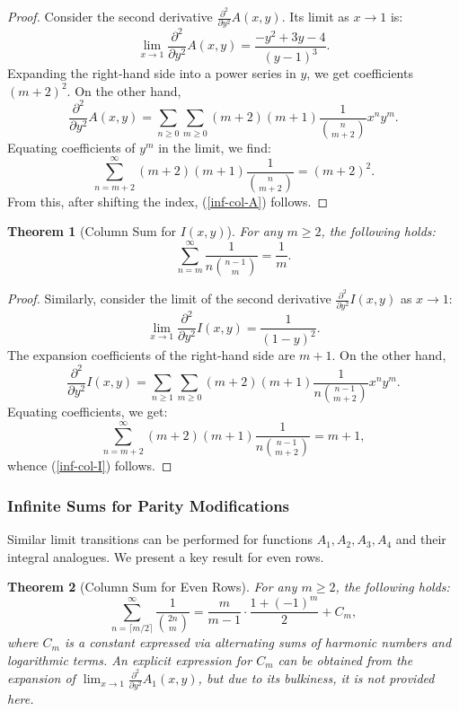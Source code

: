 \documentclass[12pt]{article}
\newtheorem{theorem}{Theorem}[section]
\begin{document}
\begin{proof}
Consider the second derivative \( \frac{\partial^2}{\partial y^2} A(x,y) \). Its limit as \( x \to 1 \) is:
\[
\lim_{x \to 1} \frac{\partial^2}{\partial y^2} A(x,y) = \frac{-y^2 + 3y - 4}{(y-1)^3}.
\]
Expanding the right-hand side into a power series in \( y \), we get coefficients \( (m+2)^2 \). On the other hand,
\[
\frac{\partial^2}{\partial y^2} A(x,y) = \sum_{n \geq 0} \sum_{m \geq 0} (m+2)(m+1) \frac{1}{\binom{n}{m+2}} x^n y^m.
\]
Equating coefficients of \( y^m \) in the limit, we find:
\[
\sum_{n=m+2}^{\infty} (m+2)(m+1) \frac{1}{\binom{n}{m+2}} = (m+2)^2.
\]
From this, after shifting the index, (\ref{inf-col-A}) follows.
\end{proof}

\begin{theorem}[Column Sum for \( I(x,y) \)]
For any \( m \geq 2 \), the following holds:
\begin{equation}\label{inf-col-I}
\sum_{n=m}^{\infty} \frac{1}{n \binom{n-1}{m}} = \frac{1}{m}.
\end{equation}
\end{theorem}

\begin{proof}
Similarly, consider the limit of the second derivative \( \frac{\partial^2}{\partial y^2} I(x,y) \) as \( x \to 1 \):
\[
\lim_{x \to 1} \frac{\partial^2}{\partial y^2} I(x,y) = \frac{1}{(1-y)^2}.
\]
The expansion coefficients of the right-hand side are \( m+1 \). On the other hand,
\[
\frac{\partial^2}{\partial y^2} I(x,y) = \sum_{n \geq 1} \sum_{m \geq 0} (m+2)(m+1) \frac{1}{n \binom{n-1}{m+2}} x^n y^m.
\]
Equating coefficients, we get:
\[
\sum_{n=m+2}^{\infty} (m+2)(m+1) \frac{1}{n \binom{n-1}{m+2}} = m+1,
\]
whence (\ref{inf-col-I}) follows.
\end{proof}

\subsubsection{Infinite Sums for Parity Modifications}

Similar limit transitions can be performed for functions \( A_1, A_2, A_3, A_4 \) and their integral analogues. We present a key result for even rows.

\begin{theorem}[Column Sum for Even Rows]
For any \( m \geq 2 \), the following holds:
\begin{equation}\label{inf-col-A1}
\sum_{n = \lceil m/2 \rceil}^{\infty} \frac{1}{\binom{2n}{m}} = \frac{m}{m-1} \cdot \frac{1 + (-1)^m}{2} + C_m,
\end{equation}
where \( C_m \) is a constant expressed via alternating sums of harmonic numbers and logarithmic terms. An explicit expression for \( C_m \) can be obtained from the expansion of \( \lim_{x \to 1} \frac{\partial^2}{\partial y^2} A_1(x,y) \), but due to its bulkiness, it is not provided here.
\end{theorem}
\end{document}
